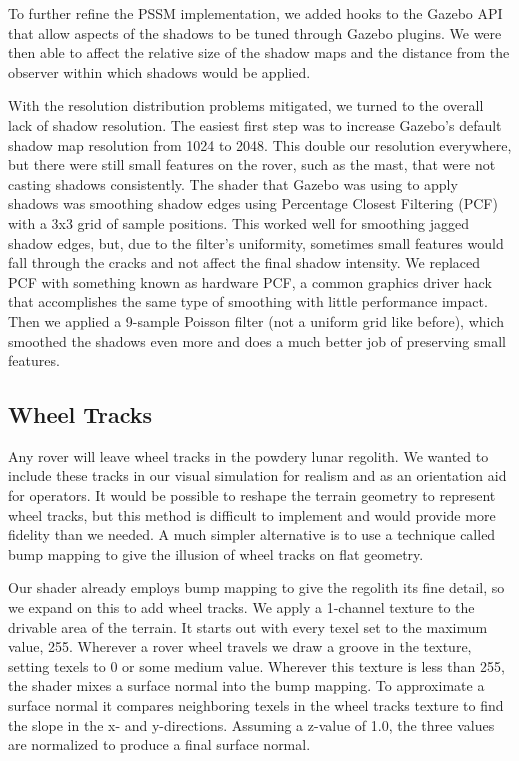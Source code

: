 \documentclass[twocolumn,letterpaper]{IEEEAerospaceCLS}  %
\begin{document}
To further refine the PSSM implementation, we added hooks to the Gazebo API that allow aspects of the shadows to be tuned through Gazebo plugins. We were then able to affect the relative size of the shadow maps and the distance from the observer within which shadows would be applied.

With the resolution distribution problems mitigated, we turned to the overall lack of shadow resolution. The easiest first step was to increase Gazebo's default shadow map resolution from 1024 to 2048. This double our resolution everywhere, but there were still small features on the rover, such as the mast, that were not casting shadows consistently. The shader that Gazebo was using to apply shadows was smoothing shadow edges using Percentage Closest Filtering (PCF) with a 3x3 grid of sample positions. This worked well for smoothing jagged shadow edges, but, due to the filter's uniformity, sometimes small features would fall through the cracks and not affect the final shadow intensity. We replaced PCF with something known as hardware PCF, a common graphics driver hack that accomplishes the same type of smoothing with little performance impact. Then we applied a 9-sample Poisson filter (not a uniform grid like before), which smoothed the shadows even more and does a much better job of preserving small features.

\subsection{Wheel Tracks}
Any rover will leave wheel tracks in the powdery lunar regolith. We wanted to include these tracks in our visual simulation for realism and as an orientation aid for operators. It would be possible to reshape the terrain geometry to represent wheel tracks, but this method is difficult to implement and would provide more fidelity than we needed. A much simpler alternative is to use a technique called bump mapping to give the illusion of wheel tracks on flat geometry.

Our shader already employs bump mapping to give the regolith its fine detail, so we expand on this to add wheel tracks. We apply a 1-channel texture to the drivable area of the terrain. It starts out with every texel set to the maximum value, 255. Wherever a rover wheel travels we draw a groove in the texture, setting texels to 0 or some medium value. Wherever this texture is less than 255, the shader mixes a surface normal into the bump mapping. To approximate a surface normal it compares neighboring texels in the wheel tracks texture to find the slope in the x- and y-directions. Assuming a z-value of 1.0, the three values are normalized to produce a final surface normal.
\end{document}
